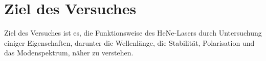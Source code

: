 \section{Ziel des Versuches}
\label{sec:versuchsziel}

Ziel des Versuches ist es, die Funktionsweise des HeNe-Lasers durch Untersuchung einiger Eigenschaften, darunter die Wellenlänge, die Stabilität, Polarisation und das Modenspektrum, näher zu verstehen.